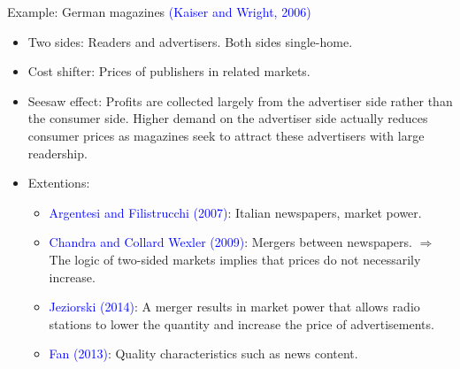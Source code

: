 \documentclass[aspectratio=169]{beamer}  %
\begin{document}
\begin{frame}{Example: German magazines \textcolor{blue}{(Kaiser and Wright, 2006)}}
    \begin{itemize}
        \item Two sides: Readers and advertisers. Both sides single-home.
        \item Cost shifter: Prices of publishers in related markets.
        \item Seesaw effect: Profits are collected largely from the advertiser side rather than the consumer side. Higher demand on the advertiser side actually reduces consumer prices as magazines seek to attract these advertisers with large readership.
        \item Extentions:
        \begin{itemize}
            \item \textcolor{blue}{Argentesi and Filistrucchi (2007)}: Italian newspapers, market power.
            \item \textcolor{blue}{Chandra and Collard Wexler (2009)}: Mergers between newspapers. $\Rightarrow$ The logic of two-sided markets implies that prices do not necessarily increase.
            \item \textcolor{blue}{Jeziorski (2014)}: A merger results in market power that allows radio stations to lower the quantity and increase the price of advertisements.
            \item \textcolor{blue}{Fan (2013)}: Quality characteristics such as news content.
        \end{itemize}
        
    \end{itemize}
\end{frame}
\end{document}
